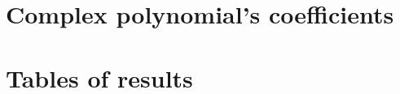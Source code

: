 \documentclass[pre-defesa]{packages/icmc}
\begin{document}




\begin{apendicesenv}

    \chapter{Complex polynomial's coefficients}
	\label{chapter:poly}
	
    
    \chapter{Tables of results}
    \label{chapter:tables}
    
       

\end{apendicesenv}




%    

\end{document}
